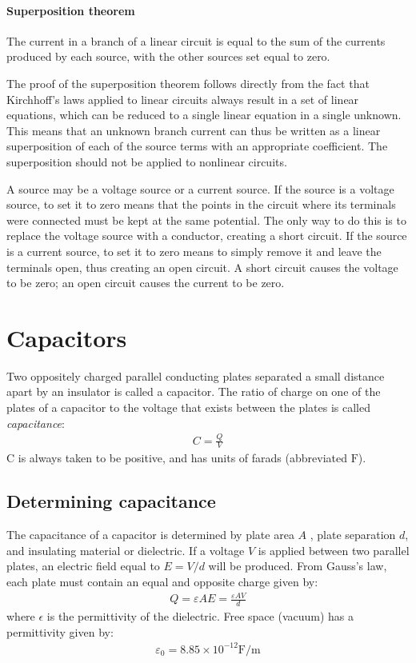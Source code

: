 \documentclass[../../document]{subfiles}
\begin{document}
\paragraph*{Superposition theorem}
The current in a branch of a linear circuit is equal to the sum of the currents
produced by each source, with the other sources set equal to zero.
\cite{practical_electronics}

The proof of the superposition theorem follows directly from the fact that
Kirchhoff’s laws applied to linear circuits always result in a set of linear
equations, which can be reduced to a single linear equation in a single
unknown. This means that an unknown branch current can thus be written as a
linear superposition of each of the source terms with an appropriate
coefficient. The superposition should not be applied to nonlinear circuits.
\cite{practical_electronics}

A source may be a voltage source or a current source. If the source is a
voltage source, to set it to zero means that the points in the circuit where
its terminals were connected must be kept at the same potential. The only way
to do this is to replace the voltage source with a conductor, creating a short
circuit. If the source is a current source, to set it to zero means to simply
remove it and leave the terminals open, thus creating an open circuit. A short
circuit causes the voltage to be zero; an open circuit causes the current to be
zero. \cite{practical_electronics}

\section{Capacitors}
Two oppositely charged parallel conducting plates separated a small distance
apart by an insulator is called a capacitor. The
ratio of charge on one of the plates of a capacitor to the voltage that exists
between the plates is called \emph{capacitance}: \cite{practical_electronics}
\begin{gather}
	C=\frac{Q}{V}
\end{gather}
C is always taken to be positive, and has units of farads (abbreviated
\(\unit{\farad}\)). \cite{practical_electronics}

\subsection{Determining capacitance}
The capacitance of a capacitor is determined by plate area \(A\) , plate
separation \(d\), and insulating material or dielectric. If a voltage \(V\)  is
applied between two parallel plates, an electric field equal to \(E = V/d\)
will be produced. From Gauss’s law, each plate must contain an equal and
opposite charge given by:
\begin{gather}
	Q=\varepsilon AE = \frac{\varepsilon AV}{d}
\end{gather}
where \(\epsilon\)  is the permittivity of the dielectric.
Free space (vacuum) has a permittivity
given by: \cite{practical_electronics}
\begin{gather}
	\varepsilon_0 = 8.85 \times 10^{-12}\unit{\farad\per\meter}
\end{gather}
\end{document}
